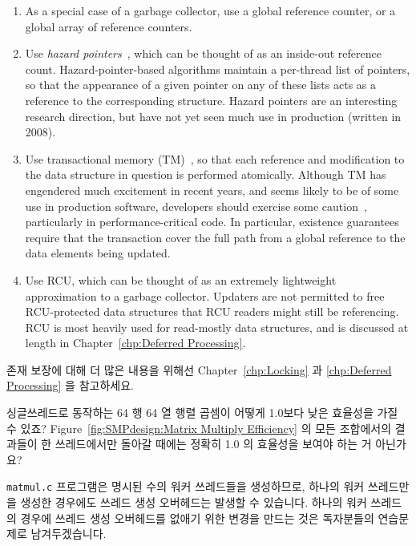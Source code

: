 \begin{enumerate}
\begin{enumerate}
	\item	As a special case of a garbage collector, use a global
		reference counter, or a global array of reference counters.
	\item	Use \emph{hazard pointers}~\cite{MagedMichael04a}, which
		can be thought of as an inside-out reference count.
		Hazard-pointer-based algorithms maintain a per-thread list of
		pointers, so that the appearance of a given pointer on
		any of these lists acts as a reference to the corresponding
		structure.
		Hazard pointers are an interesting research direction, but
		have not yet seen much use in production (written in 2008).
	\item	Use transactional memory
		(TM)~\cite{Herlihy93a,DBLomet1977SIGSOFT,Shavit95},
		so that each reference and
		modification to the data structure in question is
		performed atomically.
		Although TM has engendered much excitement in recent years,
		and seems likely to be of some use in production software,
		developers should exercise some
		caution~\cite{Blundell2005DebunkTM,Blundell2006TMdeadlock,McKenney2007PLOSTM},
		particularly in performance-critical code.
		In particular, existence guarantees require that the
		transaction cover the full path from a global reference
		to the data elements being updated.
	\item	Use RCU, which can be thought of as an extremely lightweight
		approximation to a garbage collector.
		Updaters are not permitted to free RCU-protected
		data structures that RCU readers might still be referencing.
		RCU is most heavily used for read-mostly data structures,
		and is discussed at length in
		Chapter~\ref{chp:Deferred Processing}.
	\fi
	\end{enumerate}

	존재 보장에 대해 더 많은 내용을 위해선 Chapter~\ref{chp:Locking} 과
	\ref{chp:Deferred Processing} 을 참고하세요.

\QuickQ{}
	싱글쓰레드로 동작하는 64 행 64 열 행렬 곱셈이 어떻게 1.0보다 낮은
	효율성을 가질 수 있죠?
	Figure~\ref{fig:SMPdesign:Matrix Multiply Efficiency} 의 모든
	조합에서의 결과들이 한 쓰레드에서만 돌아갈 때에는 정확히 1.0 의
	효율성을 보여야 하는 거 아닌가요?

\QuickA{}
	\texttt{matmul.c} 프로그램은 명시된 수의 워커 쓰레드들을 생성하므로,
	하나의 워커 쓰레드만을 생성한 경우에도 쓰레드 생성 오버헤드는 발생할 수
	있습니다.
	하나의 워커 쓰레드의 경우에 쓰레드 생성 오버헤드를 없애기 위한 변경을
	만드는 것은 독자분들의 연습문제로 남겨두겠습니다.
	\iffalse


\end{enumerate}
